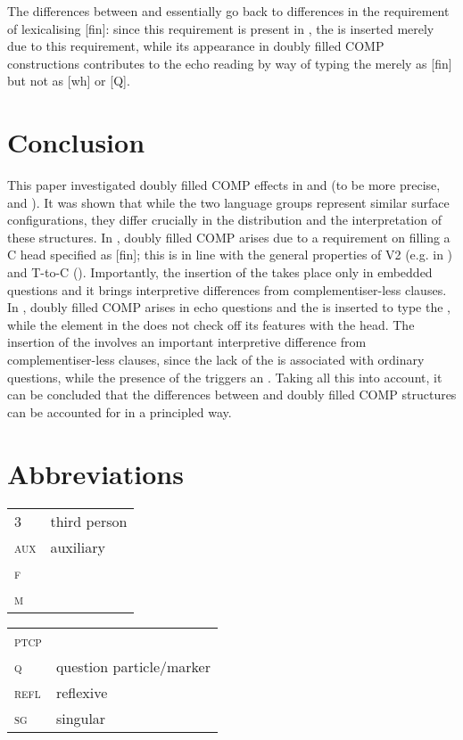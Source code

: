 \documentclass[output=paper,modfonts, hidelinks, newtxmath]{langscibook}
\begin{document}
The differences between  and  essentially go back to differences in the requirement of lexicalising [fin]: since this requirement is present in , the  is inserted merely due to this requirement, while its appearance in  doubly filled COMP constructions contributes to the echo reading by way of typing the  merely as [fin] but not as [wh] or [Q].

\section{Conclusion}
This paper investigated doubly filled COMP effects in  and  (to be more precise,  and ). It was shown that while the two language groups represent similar surface configurations, they differ crucially in the distribution and the interpretation of these structures. In , doubly filled COMP arises due to a requirement on filling a C head specified as [fin]; this is in line with the general properties of V2 (e.g. in ) and T-to-C (). Importantly, the insertion of the  takes place only in embedded questions and it brings interpretive differences from complementiser-less clauses. In , doubly filled COMP arises in echo questions and the  is inserted to type the , while the element in the  does not check off its features with the head. The insertion of the  involves an important interpretive difference from complementiser-less clauses, since the lack of the  is associated with ordinary questions, while the presence of the  triggers an . Taking all this into account, it can be concluded that the differences between  and  doubly filled COMP structures can be accounted for in a principled way.

\section*{Abbreviations}

\begin{tabularx}{.5\textwidth}{@{}lQ@{}}
3&third person\\
\textsc{aux}&auxiliary\\
\textsc{f}&\\
\textsc{m}&\\
\end{tabularx}%
\begin{tabularx}{.5\textwidth}{@{}lQ@{}}
\textsc{ptcp}&\\
\textsc{q}&question particle/marker\\
\textsc{refl}&reflexive\\
\textsc{sg}&singular\\
\end{tabularx}
\end{document}
